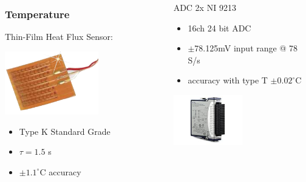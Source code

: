 \documentclass[10pt]{beamer}
\begin{document}

\begin{frame}


\begin{columns}
\begin{column}{0.5\textwidth}
  \frametitle{Temperature}
Thin-Film Heat Flux Sensor:
 \begin{center}
     \includegraphics[width=0.6\textwidth]{film}
     \end{center}
\begin{itemize}
\item Type K Standard Grade
\item $\tau = 1.5$ s
\item $\pm 1.1^{\circ}$C accuracy

\end{itemize}
\end{column}
\begin{column}{0.5\textwidth}  %
  ADC 2x NI 9213 
     
     \begin{itemize}
      \item 16ch 24 bit ADC
      \item $\pm$78.125mV input range @ 78 S/s
      \item accuracy with type T $\pm 0.02^{\circ}$C
      \end{itemize}
      
       \begin{center}
     \includegraphics[width=0.5\textwidth]{adc}
     \end{center}
\end{column}
\end{columns}
\end{frame}
\end{document}
